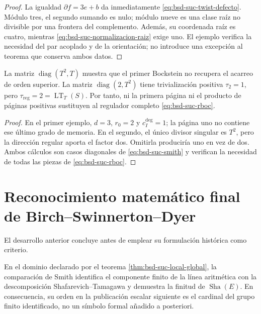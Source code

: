 \begin{proof}
La igualdad \(\partial f=3e+b\) da inmediatamente
\eqref{eq:bsd-suc-twist-defecto}. Módulo tres, el segundo sumando es nulo;
módulo nueve es una clase raíz no divisible por una frontera del complemento.
Además, su coordenada raíz es cuatro, mientras
\eqref{eq:bsd-suc-normalizacion-raiz} exige uno. El ejemplo verifica la
necesidad del par acoplado y de la orientación; no introduce una excepción
al teorema que conserva ambos datos.
\end{proof}

\begin{ablation}
\label{abl:bsd-suc-bockstein}
La matriz \(\operatorname{diag}(T^2,T)\) muestra que el primer Bockstein no
recupera el acarreo de orden superior. La matriz
\(\operatorname{diag}(2,T^2)\) tiene trivialización positiva
\(\tau_2=1\), pero
\(\tau_{\mathrm{reg}}=2=\operatorname{LT}_{T}(S)\). Por tanto, ni la
primera página ni el producto de páginas positivas sustituyen al regulador
completo \eqref{eq:bsd-suc-rboc}.
\end{ablation}

\begin{proof}
En el primer ejemplo, \(d=3\), \(r_0=2\) y
\(c_I^{\deg}=1\); la página uno no contiene ese último grado de memoria. En
el segundo, el único divisor singular es \(T^2\), pero la dirección regular
aporta el factor dos. Omitirla produciría uno en vez de dos. Ambos cálculos
son casos diagonales de \eqref{eq:bsd-suc-smith} y verifican la necesidad de
todas las piezas de \eqref{eq:bsd-suc-rboc}.
\end{proof}
\section*{Reconocimiento matemático final de Birch--Swinnerton--Dyer}

El desarrollo anterior concluye antes de emplear su formulación histórica
como criterio.

En el dominio declarado por el teorema
\ref{thm:bsd-suc-local-global}, la comparación de Smith identifica el
componente finito de la línea aritmética con la descomposición
Shafarevich--Tamagawa y demuestra la finitud de
\(\operatorname{Sha}(E)\). En consecuencia, su orden en la publicación
escalar siguiente es el cardinal del grupo finito identificado, no un símbolo
formal añadido a posteriori.

